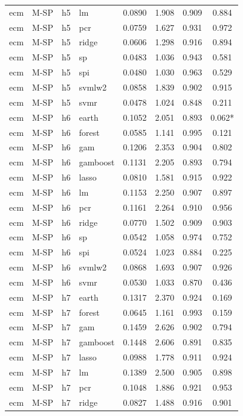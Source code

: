 \begin{ThreePartTable}
\begin{longtable}[t]{llclcccc}
ecm & M-SP & h5 & lm & 0.0890 & 1.908 & 0.909 & 0.884\\
ecm & M-SP & h5 & pcr & 0.0759 & 1.627 & 0.931 & 0.972\\
ecm & M-SP & h5 & ridge & 0.0606 & 1.298 & 0.916 & 0.894\\
ecm & M-SP & h5 & sp & 0.0483 & 1.036 & 0.943 & 0.581\\
ecm & M-SP & h5 & spi & 0.0480 & 1.030 & 0.963 & 0.529\\
ecm & M-SP & h5 & svmlw2 & 0.0858 & 1.839 & 0.902 & 0.915\\
ecm & M-SP & h5 & svmr & 0.0478 & 1.024 & 0.848 & 0.211\\
\addlinespace
ecm & M-SP & h6 & earth & 0.1052 & 2.051 & 0.893 & 0.062*\\
ecm & M-SP & h6 & forest & 0.0585 & 1.141 & 0.995 & 0.121\\
ecm & M-SP & h6 & gam & 0.1206 & 2.353 & 0.904 & 0.802\\
ecm & M-SP & h6 & gamboost & 0.1131 & 2.205 & 0.893 & 0.794\\
ecm & M-SP & h6 & lasso & 0.0810 & 1.581 & 0.915 & 0.922\\
ecm & M-SP & h6 & lm & 0.1153 & 2.250 & 0.907 & 0.897\\
ecm & M-SP & h6 & pcr & 0.1161 & 2.264 & 0.910 & 0.956\\
ecm & M-SP & h6 & ridge & 0.0770 & 1.502 & 0.909 & 0.903\\
ecm & M-SP & h6 & sp & 0.0542 & 1.058 & 0.974 & 0.752\\
ecm & M-SP & h6 & spi & 0.0524 & 1.023 & 0.884 & 0.225\\
ecm & M-SP & h6 & svmlw2 & 0.0868 & 1.693 & 0.907 & 0.926\\
ecm & M-SP & h6 & svmr & 0.0530 & 1.033 & 0.870 & 0.436\\
\addlinespace
ecm & M-SP & h7 & earth & 0.1317 & 2.370 & 0.924 & 0.169\\
ecm & M-SP & h7 & forest & 0.0645 & 1.161 & 0.993 & 0.159\\
ecm & M-SP & h7 & gam & 0.1459 & 2.626 & 0.902 & 0.794\\
ecm & M-SP & h7 & gamboost & 0.1448 & 2.606 & 0.891 & 0.835\\
ecm & M-SP & h7 & lasso & 0.0988 & 1.778 & 0.911 & 0.924\\
ecm & M-SP & h7 & lm & 0.1389 & 2.500 & 0.905 & 0.898\\
ecm & M-SP & h7 & pcr & 0.1048 & 1.886 & 0.921 & 0.953\\
ecm & M-SP & h7 & ridge & 0.0827 & 1.488 & 0.916 & 0.901\\

\end{longtable}
\end{ThreePartTable}
